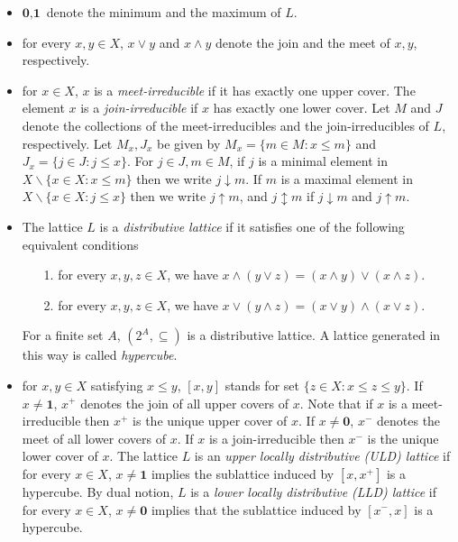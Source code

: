 \documentclass{article}
\theoremstyle{definition}
\newcommand\set[1]{\{ #1 \}}
\begin{document}
\begin{itemize}
  \item $\textbf{0},\textbf{1}$ denote the minimum and the maximum of $L$. 
  \item for every $x,y \in X$, $x\lor y$ and $x \land y$ denote the join and the meet of $x,y$, respectively. 
  \item for $x\in X$, $x$ is a \emph{meet-irreducible} if it has exactly one upper cover. The element $x$ is a \emph{join-irreducible} if $x$ has exactly one lower cover. Let $M$ and $J$ denote the collections of the meet-irreducibles and the join-irreducibles of $L$, respectively. Let $M_x,J_x$ be given by $M_x=\set{m \in M: x \leq m}$ and $J_x=\set{j \in J: j \leq x}$. For $j \in J,m \in M$, if $j$ is a minimal element in $X\backslash  \set{ x \in X: x \leq m }$ then we write $j \downarrow m$. If $m$ is a maximal element in $X \backslash  \set{x \in X: j \leq x}$ then we write $j \uparrow m$, and $j \updownarrow m$ if $j \downarrow m$ and $j \uparrow m$. 
  \item The lattice $L$ is a \emph{distributive lattice} if it satisfies one of the following equivalent conditions
       \begin{itemize}
         \item[1. ] for every $x,y,z\in X$, we have $x \land (y \lor z)=(x \land y) \lor (x \land z)$. 
         \item[2. ] for every $x,y,z\in X$, we have $x \lor (y \land z)=(x \lor y) \land (x \lor z)$.
       \end{itemize}  
For a finite set $A$, $(2^{A},\subseteq)$ is a distributive lattice. A lattice generated in this way is called \emph{hypercube}. 
 \item for $x,y\in X$ satisfying $x \leq y$, $[x,y]$ stands for set $\set{z \in X: x \leq z \leq y}$. If $x \neq \textbf{1}$, $x^{+}$ denotes the join of all upper covers of $x$. Note that if $x$ is a meet-irreducible then $x^{+}$ is the unique upper cover of $x$. If $x\neq \textbf{0}$, $x^{-}$ denotes the meet of all lower covers of $x$. If $x$ is a join-irreducible then $x^{-}$ is the unique lower cover of $x$. The lattice $L$ is an \emph{upper locally distributive (ULD) lattice} \cite{M90,D40} if for every $x \in X$, $x \neq \textbf{1}$ implies the sublattice induced by $[x,x^{+}]$ is a hypercube. By dual notion, $L$ is a \emph{lower locally distributive (LLD) lattice} if for every $x\in X$, $x\neq \textbf{0}$ implies that the sublattice induced by $[x^{-},x]$ is a hypercube.
\end{itemize}  
\end{document}
